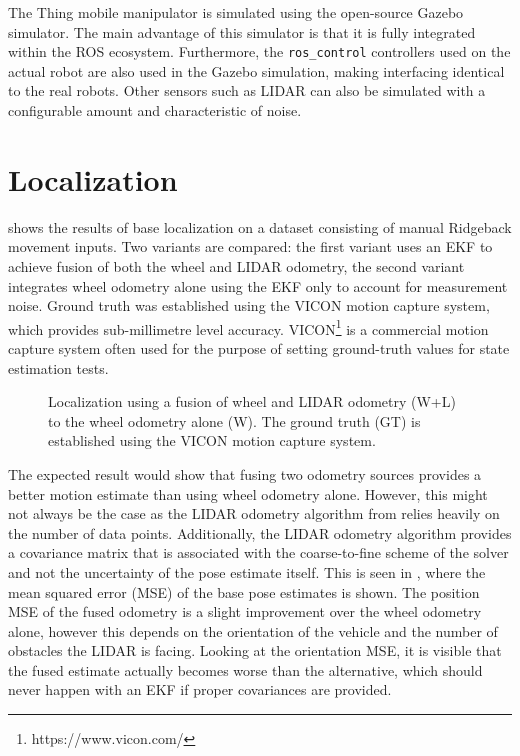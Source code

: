 \documentclass[times, utf8, diplomski, english]{fer}
\begin{document}
The Thing mobile manipulator is simulated using the open-source Gazebo simulator.
The main advantage of this simulator is that it is fully integrated within the ROS ecosystem.
Furthermore, the \verb|ros_control| controllers used on the actual robot are also used in the Gazebo simulation, making interfacing identical to the real robots.
Other sensors such as LIDAR can also be simulated with a configurable amount and characteristic of noise.

\section{Localization}
 shows the results of base localization on a dataset consisting of manual Ridgeback movement inputs.
Two variants are compared: the first variant  uses an EKF to achieve fusion of both the wheel and LIDAR odometry, the second variant integrates wheel odometry alone using the EKF only to account for measurement noise.
Ground truth was established using the VICON motion capture system, which provides sub-millimetre level accuracy.
VICON\footnote{https://www.vicon.com/} is a commercial motion capture system often used for the purpose of setting ground-truth values for state estimation tests. 
\begin{figure}[h]
\centering

\caption{Localization using a fusion of wheel and LIDAR odometry (W+L) to the wheel odometry alone (W). The ground truth (GT) is established using the VICON motion capture system.}
\label{fig:ekf_localization}
\end{figure}

The expected result would show that fusing two odometry sources provides a better motion estimate than using wheel odometry alone. 
However, this might not always be the case as the LIDAR odometry algorithm from  relies heavily on the number of data points.
Additionally, the LIDAR odometry algorithm provides a covariance matrix that is associated with the coarse-to-fine scheme of the solver and not the uncertainty of the pose estimate itself.
This is seen in , where the mean squared error (MSE) of the base pose estimates is shown.
The position MSE of the fused odometry is a slight improvement over the wheel odometry alone, however this depends on the orientation of the vehicle and the number of obstacles the LIDAR is facing.
Looking at the orientation MSE, it is visible that the fused estimate actually becomes worse than the alternative, which should never happen with an EKF if proper covariances are provided.
\end{document}
